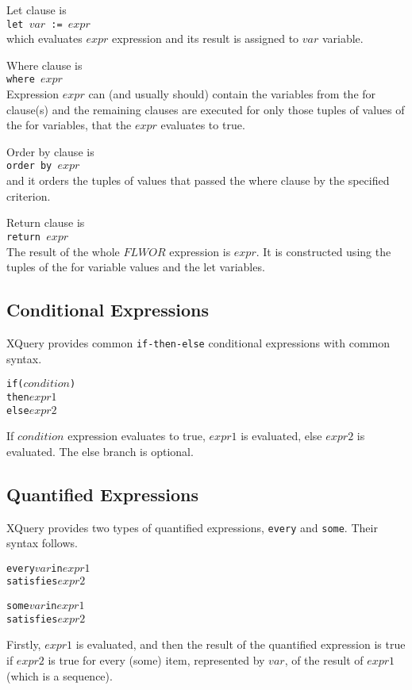 Let clause is \\
\texttt{let $var$ := $expr$} \\
which evaluates $expr$ expression and its result is assigned to $var$ variable.

Where clause is \\
\texttt{where $expr$} \\
Expression $expr$ can (and usually should) contain the variables from the for clause(s) and the remaining clauses are executed for only those tuples of values of the for variables, that the $expr$ evaluates to true.

Order by clause is \\
\texttt{order by $expr$} \\
and it orders the tuples of values that passed the where clause by the specified criterion.

Return clause is \\
\texttt{return $expr$} \\
The result of the whole $FLWOR$ expression is $expr$. It is constructed using the tuples of the for variable values and the let variables.

\subsection{Conditional Expressions}
XQuery provides common \texttt{if-then-else} conditional expressions with common syntax.
\begin{alltt}
if (\(condition\))
then \(expr1\)
else \(expr2\)
\end{alltt}
If $condition$ expression evaluates to true, $expr1$ is evaluated, else $expr2$ is evaluated. The else branch is optional.

\subsection{Quantified Expressions}
XQuery provides two types of quantified expressions, \texttt{every} and \texttt{some}. Their syntax follows.
\begin{alltt}
every \(var\) in \(expr1\)
satisfies \(expr2\)
\end{alltt}
\begin{alltt}
some \(var\) in \(expr1\)
satisfies \(expr2\)
\end{alltt}

Firstly, $expr1$ is evaluated, and then the result of the quantified expression is true if $expr2$ is true for every (some) item, represented by $var$, of the result of $expr1$ (which is a sequence). 

